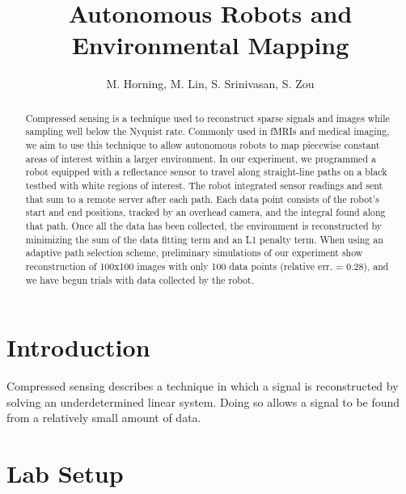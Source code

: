 \documentclass[english]{article}\usepackage[]{graphicx}\usepackage[]{color}
\begin{document}
\title{Autonomous Robots and Environmental Mapping}

\author{M. Horning, M. Lin, S. Srinivasan, S. Zou}

\maketitle

\begin{abstract}

Compressed sensing is a technique used to reconstruct sparse signals and images while sampling well below the Nyquist rate. Commonly used in fMRIs and medical imaging, we aim to use this technique to allow autonomous robots to map piecewise constant areas of interest within a larger environment. In our experiment, we programmed a robot equipped with a reflectance sensor to travel along straight-line paths on a black testbed with white regions of interest. The robot integrated sensor readings and sent that sum to a remote server after each path. Each data point consists of the robot's start and end positions, tracked by an overhead camera, and the integral found along that path. Once all the data has been collected, the environment is reconstructed by minimizing the sum of the data fitting term and an L1 penalty term. When using an adaptive path selection scheme, preliminary simulations of our experiment show reconstruction of 100x100 images with only 100 data points (relative err. = 0.28), and we have begun trials with data collected by the robot.

\end{abstract}

\pagebreak
\tableofcontents
\pagebreak

\section{Introduction}

Compressed sensing describes a technique in which a signal is reconstructed by solving an underdetermined linear system. Doing so allows a signal to be found from a relatively small amount of data. 

\section{Lab Setup}
\end{document}
